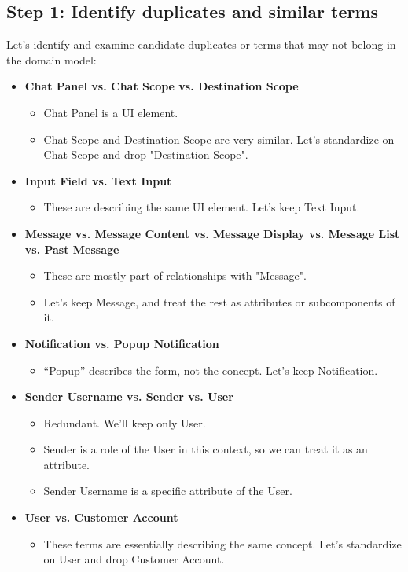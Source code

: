 \documentclass[]{VUMIFTemplateClass}
\begin{document}
\subsection{Step 1: Identify duplicates and similar terms}
Let’s identify and examine candidate duplicates or terms that may not belong in the domain model:

\begin{itemize}
    \item \textbf{Chat Panel vs. Chat Scope vs. Destination Scope}
    \begin{itemize}
        \item Chat Panel is a UI element.
        \item Chat Scope and Destination Scope are very similar. Let's standardize on Chat Scope and drop "Destination Scope".
    \end{itemize}

    \item \textbf{Input Field vs. Text Input}
    \begin{itemize}
        \item These are describing the same UI element. Let’s keep Text Input.
    \end{itemize}

    \item \textbf{Message vs. Message Content vs. Message Display vs. Message List vs. Past Message}
    \begin{itemize}
        \item These are mostly part-of relationships with "Message".
        \item Let’s keep Message, and treat the rest as attributes or subcomponents of it.
    \end{itemize}

    \item \textbf{Notification vs. Popup Notification}
    \begin{itemize}
        \item “Popup” describes the form, not the concept. Let’s keep Notification.
    \end{itemize}

    \item \textbf{Sender Username vs. Sender vs. User}
    \begin{itemize}
        \item Redundant. We’ll keep only User.
        \item Sender is a role of the User in this context, so we can treat it as an attribute.
        \item Sender Username is a specific attribute of the User.
    \end{itemize}

    \item \textbf{User vs. Customer Account}
    \begin{itemize}
        \item These terms are essentially describing the same concept. Let’s standardize on User and drop Customer Account.
    \end{itemize}
\end{itemize}
\end{document}
